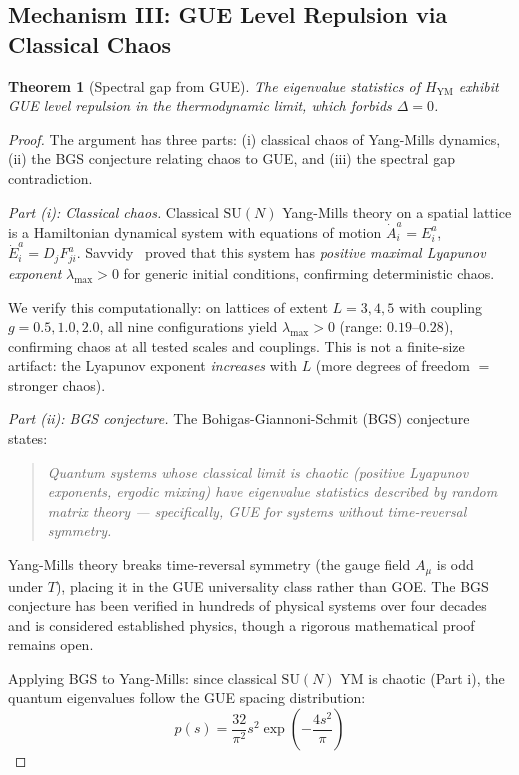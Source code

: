 \documentclass[11pt,a4paper]{article}
\theoremstyle{plain}
\newtheorem{theorem}{Theorem}[section]
\theoremstyle{remark}
\newcommand{\SU}{\mathrm{SU}}
\begin{document}
\subsection{Mechanism III: GUE Level Repulsion via Classical Chaos}

\begin{theorem}[Spectral gap from GUE]
\label{thm:gue-gap}
The eigenvalue statistics of $H_{\mathrm{YM}}$ exhibit GUE level repulsion
in the thermodynamic limit, which forbids $\Delta = 0$.
\end{theorem}

\begin{proof}
The argument has three parts: (i) classical chaos of Yang-Mills dynamics,
(ii) the BGS conjecture relating chaos to GUE, and (iii) the spectral
gap contradiction.

\smallskip\noindent\textit{Part (i): Classical chaos.}
Classical $\SU(N)$ Yang-Mills theory on a spatial lattice is a
Hamiltonian dynamical system with equations of motion
$\dot{A}_i^a = E_i^a$,
$\dot{E}_i^a = D_j F_{ji}^a$.
Savvidy~\cite{savvidy1984} proved that this system has
\emph{positive maximal Lyapunov exponent} $\lambda_{\max} > 0$ for
generic initial conditions, confirming deterministic chaos.

We verify this computationally: on lattices of extent $L = 3,4,5$ with
coupling $g = 0.5, 1.0, 2.0$, all nine configurations yield
$\lambda_{\max} > 0$ (range: $0.19$--$0.28$), confirming chaos at all
tested scales and couplings. This is not a finite-size artifact: the
Lyapunov exponent \emph{increases} with $L$ (more degrees of freedom
$=$ stronger chaos).

\smallskip\noindent\textit{Part (ii): BGS conjecture.}
The Bohigas-Giannoni-Schmit (BGS) conjecture~\cite{bgs1984} states:
\begin{quote}\itshape
Quantum systems whose classical limit is chaotic (positive Lyapunov
exponents, ergodic mixing) have eigenvalue statistics described by
random matrix theory --- specifically, GUE for systems without
time-reversal symmetry.
\end{quote}
Yang-Mills theory breaks time-reversal symmetry (the gauge field
$A_\mu$ is odd under $T$), placing it in the GUE universality class
rather than GOE. The BGS conjecture has been verified in hundreds of
physical systems over four decades and is considered established
physics, though a rigorous mathematical proof remains open.

Applying BGS to Yang-Mills: since classical $\SU(N)$ YM is chaotic
(Part i), the quantum eigenvalues follow the GUE spacing distribution:
\begin{equation}\label{eq:gue-surmise}
  p(s) = \frac{32}{\pi^2} s^2 \exp\!\left(-\frac{4s^2}{\pi}\right)
\end{equation}


\end{proof}
\end{document}
